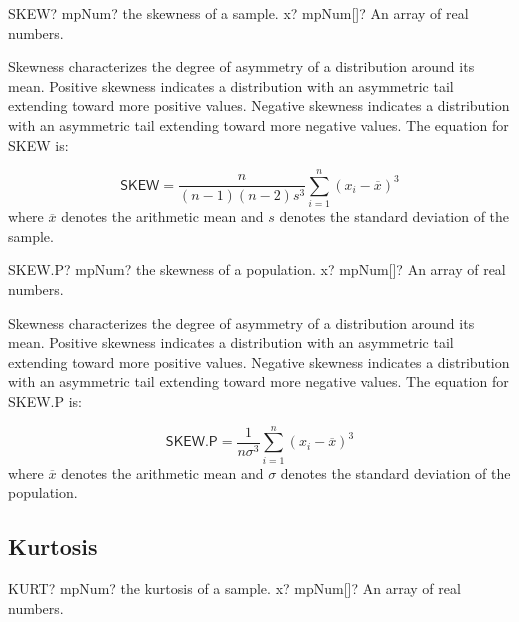 \begin{mpFunctionsExtract}
	\mpWorksheetFunctionOneNotImplemented
	{SKEW? mpNum? the skewness of a sample.}
	{x? mpNum[]? An array of real numbers.}
\end{mpFunctionsExtract}

\vspace{0.3cm}

Skewness characterizes the degree of asymmetry of a distribution around its mean. Positive skewness indicates a distribution with an asymmetric tail extending toward more positive values. Negative skewness indicates a distribution with an asymmetric tail extending toward more negative values. The equation for \textsf{SKEW} is: 

\begin{equation}
	\textsf{SKEW} = \frac{n}{(n-1)(n-2)s^3}\sum_{i=1}^n (x_i-\overline{x})^3 
\end{equation}
where $\overline{x}$ denotes the arithmetic mean and $s$ denotes the standard deviation of the sample.



\vspace{0.6cm}
\begin{mpFunctionsExtract}
	\mpWorksheetFunctionOneNotImplemented
	{SKEW.P? mpNum? the skewness of a population.}
	{x? mpNum[]? An array of real numbers.}
\end{mpFunctionsExtract}

\vspace{0.3cm}

Skewness characterizes the degree of asymmetry of a distribution around its mean. Positive skewness indicates a distribution with an asymmetric tail extending toward more positive values. Negative skewness indicates a distribution with an asymmetric tail extending toward more negative values. The equation for \textsf{SKEW.P} is: 

\begin{equation}
	\textsf{SKEW.P} = \frac{1}{n \sigma^3}\sum_{i=1}^n (x_i-\overline{x})^3 
\end{equation}
where $\overline{x}$ denotes the arithmetic mean and $\sigma$ denotes the standard deviation of the population.



\subsection{Kurtosis}


\begin{mpFunctionsExtract}
	\mpWorksheetFunctionOneNotImplemented
	{KURT? mpNum? the kurtosis of a sample.}
	{x? mpNum[]? An array of real numbers.}
\end{mpFunctionsExtract}

